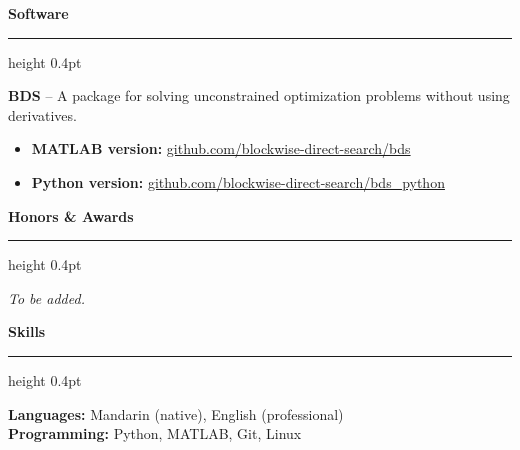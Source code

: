 \documentclass[11pt,a4paper]{article}
\newcommand{\cvsection}[1]{%
  \vspace{0.9em}%
  \noindent\textbf{\Large #1}%
  \vspace{0.3em}%
  \hrule height 0.4pt%
  \vspace{0.6em}%
}
\begin{document}
\cvsection{Software}

\textbf{BDS} -- A package for solving unconstrained optimization problems without using derivatives.
\begin{itemize}[leftmargin=1.5em,nosep,topsep=0.2em]
  \item \textbf{MATLAB version:} \href{https://github.com/blockwise-direct-search/bds}{github.com/blockwise-direct-search/bds}
  \item \textbf{Python version:} \href{https://github.com/blockwise-direct-search/bds\_python}{github.com/blockwise-direct-search/bds\_python}
\end{itemize}

\cvsection{Honors \& Awards}
\textit{To be added.}

\cvsection{Skills}

\noindent\textbf{Languages:} Mandarin (native), English (professional)\\[0.3em]
\textbf{Programming:} Python, MATLAB, Git, Linux
\end{document}
